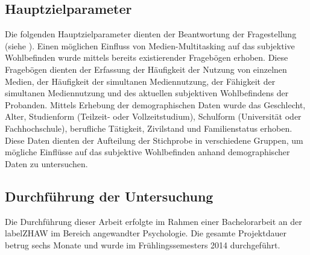 \subsection{Hauptzielparameter}\label{subsection.hauptzielparameter}
Die folgenden Hauptzielparameter dienten der Beantwortung der Fragestellung (siehe ). Einen möglichen Einfluss von Medien-Multitasking auf das subjektive Wohlbefinden wurde mittels bereits existierender Fragebögen erhoben. Diese Fragebögen dienten der Erfassung der Häufigkeit der Nutzung von einzelnen Medien, der Häufigkeit der simultanen Mediennutzung, der Fähigkeit der simultanen Mediennutzung und des aktuellen subjektiven Wohlbefindens der Probanden. Mittels Erhebung der demographischen Daten wurde das Geschlecht, Alter, Studienform (Teilzeit- oder Vollzeitstudium), Schulform (Universität oder Fachhochschule), berufliche Tätigkeit, Zivilstand und Familienstatus erhoben. Diese Daten dienten der Aufteilung der Stichprobe in verschiedene Gruppen, um mögliche Einflüsse auf das subjektive Wohlbefinden anhand demographischer Daten zu untersuchen.

\subsection{Durchführung der Untersuchung}
Die Durchführung dieser Arbeit erfolgte im Rahmen einer Bachelorarbeit an der \gls{labelZHAW} im Bereich angewandter Psychologie. Die gesamte Projektdauer betrug sechs Monate und wurde im Frühlingssemesters 2014 durchgeführt.

